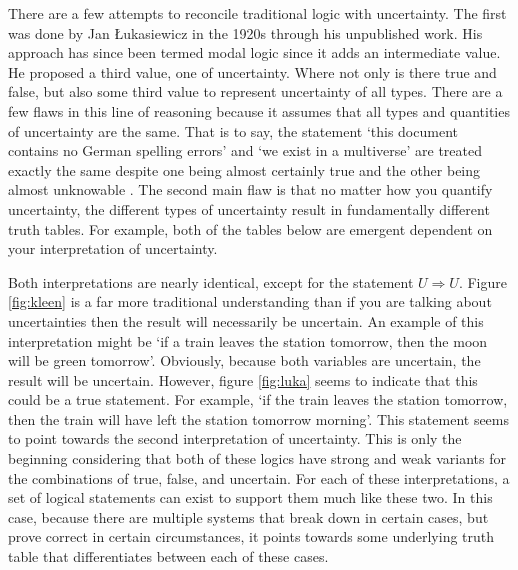 \documentclass{article}
\begin{document}
There are a few attempts to reconcile traditional logic with uncertainty. The first was done by Jan Łukasiewicz in the 1920s through his unpublished work. His approach has since been termed modal logic since it adds an intermediate value. He proposed a third value, one of uncertainty. Where not only is there true and false, but also some third value to represent uncertainty of all types. There are a few flaws in this line of reasoning because it assumes that all types and quantities of uncertainty are the same. That is to say, the statement ‘this document contains no German spelling errors’ and ‘we exist in a multiverse’ are treated exactly the same despite one being almost certainly true and the other being almost unknowable . The second main flaw is that no matter how you quantify uncertainty, the different types of uncertainty result in fundamentally different truth tables. For example, both of the tables below are emergent dependent on your interpretation of uncertainty.


\begin{figure}[!ht]
    \centering
    \begin{floatrow}
    \end{floatrow}
\end{figure}


Both interpretations are nearly identical, except for the statement $U\Rightarrow U$. Figure \ref{fig:kleen} is a far more traditional understanding than if you are talking about uncertainties then the result will necessarily be uncertain. An example of this interpretation might be ‘if a train leaves the station tomorrow, then the moon will be green tomorrow’. Obviously, because both variables are uncertain, the result will be uncertain. However, figure \ref{fig:luka} seems to indicate that this could be a true statement. For example, ‘if the train leaves the station tomorrow, then the train will have left the station tomorrow morning’. This statement seems to point towards the second interpretation of uncertainty. This is only the beginning considering that both of these logics have strong and weak variants for the combinations of true, false, and uncertain. For each of these interpretations, a set of logical statements can exist to support them much like these two. In this case, because there are multiple systems that break down in certain cases, but prove correct in certain circumstances, it points towards some underlying truth table that differentiates between each of these cases.
\end{document}

